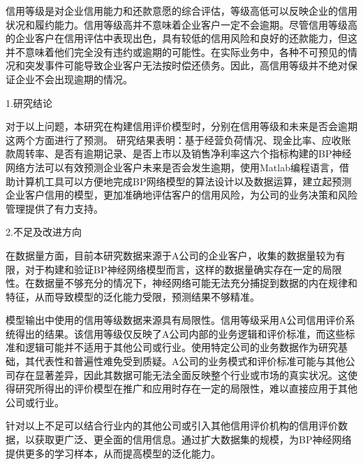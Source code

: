 \summary

信用等级是对企业信用能力和还款意愿的综合评估，等级高低可以反映企业的信用状况和履约能力。信用等级高并不意味着企业客户一定不会逾期。尽管信用等级高的企业客户在信用评估中表现出色，具有较低的信用风险和良好的还款能力，但这并不意味着他们完全没有违约或逾期的可能性。在实际业务中，各种不可预见的情况和突发事件可能导致企业客户无法按时偿还债务。因此，高信用等级并不绝对保证企业不会出现逾期的情况。

1.研究结论

对于以上问题，本研究在构建信用评价模型时，分别在信用等级和未来是否会逾期这两个方面进行了预测。
研究结果表明：基于经营负荷情况、现金比率、应收账款周转率、是否有逾期记录、是否上市以及销售净利率这六个指标构建的BP神经网络方法可以有效预测企业客户未来是否会发生逾期，使用Matlab编程语言，借助计算机工具可以方便地完成BP网络模型的算法设计以及数据运算，建立起预测企业客户信用的模型，更加准确地评估客户的信用风险，为公司的业务决策和风险管理提供了有力支持。




2.不足及改进方向

在数据量方面，目前本研究数据来源于A公司的企业客户，收集的数据量较为有限，对于构建和验证BP神经网络模型而言，这样的数据量确实存在一定的局限性。在数据量不够充分的情况下，神经网络可能无法充分捕捉到数据的内在规律和特征，从而导致模型的泛化能力受限，预测结果不够精准。

模型输出中使用的信用等级数据来源具有局限性。信用等级采用A公司信用评价系统得出的结果。该信用等级仅反映了A公司内部的业务逻辑和评价标准，而这些标准和逻辑可能并不适用于其他公司或行业。使用特定公司的业务数据作为研究基础，其代表性和普遍性难免受到质疑。A公司的业务模式和评价标准可能与其他公司存在显著差异，因此其数据可能无法全面反映整个行业或市场的真实状况。这使得研究所得出的评价模型在推广和应用时存在一定的局限性，难以直接应用于其他公司或行业。

针对以上不足可以结合行业内的其他公司或引入其他信用评价机构的信用评价数据，以获取更广泛、更全面的信用信息。通过扩大数据集的规模，为BP神经网络提供更多的学习样本，从而提高模型的泛化能力。

 